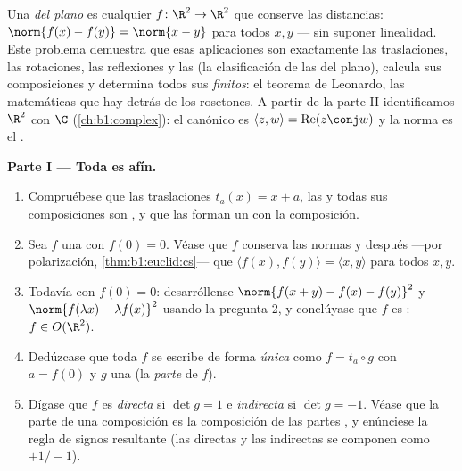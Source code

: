 \begin{problem}\label{pb:b1:euclid:1}
Una \emph{ del plano} es cualquier 
$f \colon \R^2 \to \R^2$ que conserve las distancias:
$\norm{f(x) - f(y)} = \norm{x - y}$ para todos $x, y$ --- sin
suponer linealidad. Este problema demuestra que esas aplicaciones
son exactamente las traslaciones, las rotaciones, las reflexiones y
las  (la clasificación de las  del
plano), calcula sus composiciones y determina todos sus 
\emph{finitos}: el teorema de Leonardo, las matemáticas que hay
detrás de los rosetones. A partir de la parte II identificamos $\R^2$
con $\C$ (\cref{ch:b1:complex}): el  canónico es
$\langle z, w\rangle = \operatorname{Re}(z\conj w)$ y la norma es el
.

\medskip
\noindent\textbf{Parte I --- Toda  es afín.}
\begin{enumerate}
  \item Compruébese que las traslaciones $t_a(x) = x + a$, las
          y todas sus composiciones son
        , y que las  forman un  con la
        composición.
  \item Sea $f$ una  con $f(0) = 0$. Véase que $f$
        conserva las normas y después ---por polarización,
        \cref{thm:b1:euclid:cs}--- que
        $\langle f(x), f(y)\rangle = \langle x, y\rangle$ para todos
        $x, y$.
  \item Todavía con $f(0) = 0$: desarróllense
        $\norm{f(x + y) - f(x) - f(y)}^2$ y
        $\norm{f(\lambda x) - \lambda f(x)}^2$ usando la pregunta 2,
        y conclúyase que $f$ es \emph{}: $f \in O(\R^2)$.
  \item Dedúzcase que toda  $f$ se escribe de forma
        \emph{única} como $f = t_a \circ g$ con $a = f(0)$ y $g$ una
          (la \emph{parte } de $f$).
  \item Dígase que $f$ es \emph{directa} si $\det g = 1$ e
        \emph{indirecta} si $\det g = -1$. Véase que la parte
         de una composición es la composición de las partes
        , y enúnciese la regla de signos resultante (las
        directas y las indirectas se componen como $+1/-1$).
\end{enumerate}


\end{problem}
